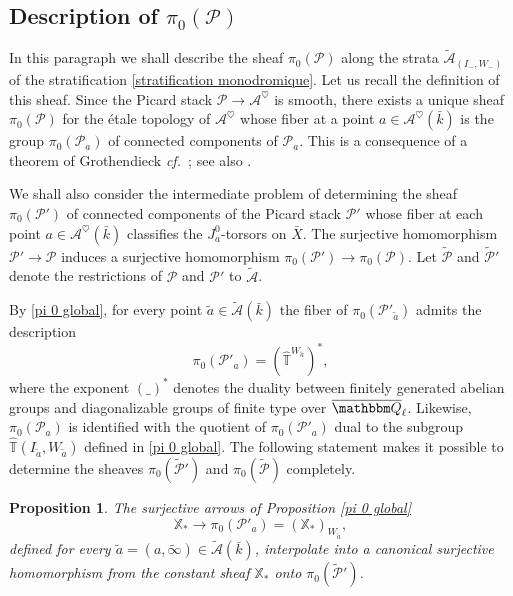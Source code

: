 \documentclass[12pt,english]{smfart}
\numberwithin{equation}{subsection}
\newtheorem{proposition}[equation]{Proposition}
\theoremstyle{remark}
\newcommand\QQ{{\mathbbm Q}}
\newcommand\cf{{\it cf.\ }}
\newcommand\Ql{{\overline\QQ_\ell}}
\begin{document}
\subsection{Description of $\pi_0(\mathcal{P})$}\label{subsection : description pi_0(P)}

In this paragraph we shall describe the sheaf $\pi_0(\mathcal{P})$ along the strata $\tilde{\mathcal{A}}_{(I_-,W_-)}$ of the stratification \ref{stratification monodromique}. Let us recall the definition of this sheaf. Since the Picard stack $\mathcal{P}\rightarrow\mathcal{A}^\heartsuit$ is smooth, there exists a unique sheaf $\pi_0(\mathcal{P})$ for the \'etale topology of $\mathcal{A}^\heartsuit$ whose fiber at a point $a\in\mathcal{A}^\heartsuit(\bar k)$ is the group $\pi_0(\mathcal{P}_a)$ of connected components of $\mathcal{P}_a$. This is a consequence of a theorem of Grothendieck \cf \cite[15.6.4]{EGA4}; see also \cite[6.2]{N}.

We shall also consider the intermediate problem of determining the sheaf $\pi_0(\mathcal{P}')$ of connected components of the Picard stack $\mathcal{P}'$ whose fiber at each point $a\in\mathcal{A}^\heartsuit(\bar k)$ classifies the $J_a^0$-torsors on $\bar X$. The surjective homomorphism $\mathcal{P}'\rightarrow\mathcal{P}$ induces a surjective homomorphism $\pi_0(\mathcal{P}')\rightarrow\pi_0(\mathcal{P})$. Let $\tilde{\mathcal{P}}$ and $\tilde{\mathcal{P}}'$ denote the restrictions of $\mathcal{P}$ and $\mathcal{P}'$ to $\tilde{\mathcal{A}}$.

By \ref{pi 0 global}, for every point $\tilde a\in\tilde{\mathcal{A}}(\bar k)$ the fiber of $\pi_0(\mathcal{P}'_{\tilde a})$ admits the description
$$\pi_0(\mathcal{P}'_a)=(\hat{\mathbb{T}}^{W_{\tilde a}})^*,$$
where the exponent $(\_)^*$ denotes the duality between finitely generated abelian groups and diagonalizable groups of finite type over $\Ql$. Likewise, $\pi_0(\mathcal{P}_a)$ is identified with the quotient of $\pi_0(\mathcal{P}'_a)$ dual to the subgroup $\hat{\mathbb{T}}(I_{\tilde a},W_{\tilde a})$ defined in \ref{pi 0 global}. The following statement makes it possible to determine the sheaves $\pi_0(\tilde{\mathcal{P}}')$ and $\pi_0(\tilde{\mathcal{P}})$ completely.

\begin{proposition}\label{surjectif}
The surjective arrows of Proposition \ref{pi 0 global}
$$\mathbb{X}_*\rightarrow\pi_0(\mathcal{P}'_a)=(\mathbb{X}_*)_{W_{\tilde a}},$$
defined for every $\tilde a=(a,\tilde\infty)\in\tilde{\mathcal{A}}(\bar k)$, interpolate into a canonical surjective homomorphism from the constant sheaf $\mathbb{X}_*$ onto $\pi_0(\tilde{\mathcal{P}}')$.
\end{proposition}
\end{document}

